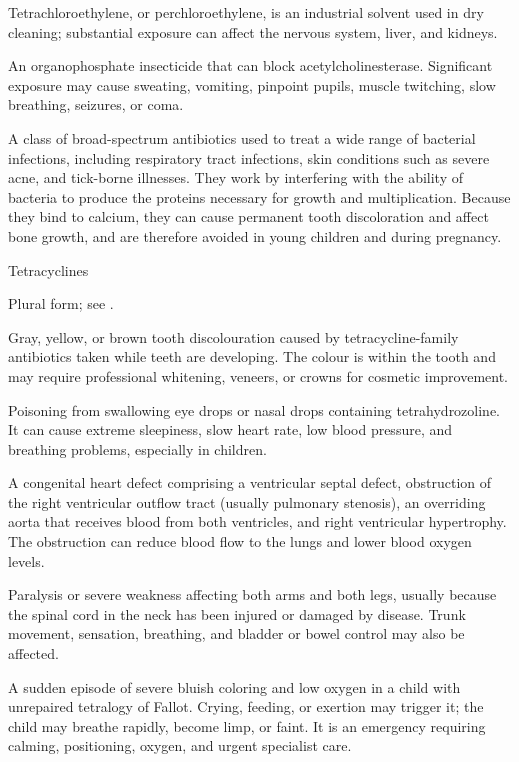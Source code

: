  Tetrachloroethylene, or perchloroethylene, is an industrial solvent used in dry cleaning; substantial exposure can affect the nervous system, liver, and kidneys.

 An organophosphate insecticide that can block acetylcholinesterase. Significant exposure may cause sweating, vomiting, pinpoint pupils, muscle twitching, slow breathing, seizures, or coma.

 A class of broad-spectrum antibiotics used to treat a wide range of bacterial infections, including respiratory tract infections, skin conditions such as severe acne, and tick-borne illnesses. They work by interfering with the ability of bacteria to produce the proteins necessary for growth and multiplication. Because they bind to calcium, they can cause permanent tooth discoloration and affect bone growth, and are therefore avoided in young children and during pregnancy.

\synonyms
Tetracyclines

 Plural form; see .

 Gray, yellow, or brown tooth discolouration caused by tetracycline-family antibiotics taken while teeth are developing. The colour is within the tooth and may require professional whitening, veneers, or crowns for cosmetic improvement.

 Poisoning from swallowing eye drops or nasal drops containing tetrahydrozoline. It can cause extreme sleepiness, slow heart rate, low blood pressure, and breathing problems, especially in children.

 A congenital heart defect comprising a ventricular septal defect, obstruction of the right ventricular outflow tract (usually pulmonary stenosis), an overriding aorta that receives blood from both ventricles, and right ventricular hypertrophy. The obstruction can reduce blood flow to the lungs and lower blood oxygen levels.

 Paralysis or severe weakness affecting both arms and both legs, usually because the spinal cord in the neck has been injured or damaged by disease. Trunk movement, sensation, breathing, and bladder or bowel control may also be affected.

 A sudden episode of severe bluish coloring and low oxygen in a child with unrepaired tetralogy of Fallot. Crying, feeding, or exertion may trigger it; the child may breathe rapidly, become limp, or faint. It is an emergency requiring calming, positioning, oxygen, and urgent specialist care.

